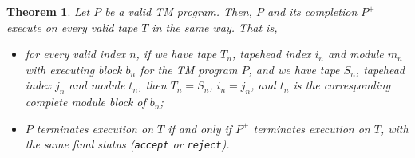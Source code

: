 \documentclass{amsart}
\newtheorem{theorem}{Theorem}[section]
\theoremstyle{definition}
\begin{document}
    \begin{theorem}
        Let $P$ be a valid TM program. Then, $P$ and its completion $P^+$ execute on every valid tape $T$ in the same way. That is,
        \begin{itemize}
            \item for every valid index $n$, if we have tape $T_n$, tapehead index $i_n$ and module $m_n$ with executing block $b_n$ for the TM program $P$, and we have tape $S_n$, tapehead index $j_n$ and module $t_n$, then $T_n = S_n$, $i_n = j_n$, and $t_n$ is the corresponding complete module block of $b_n$;
            \item $P$ terminates execution on $T$ if and only if $P^+$ terminates execution on $T$, with the same final status (\texttt{accept} or \texttt{reject}).
        \end{itemize}
    \end{theorem}
\end{document}
